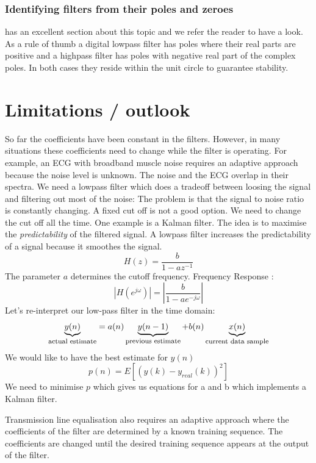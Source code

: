 \documentclass[12pt,a4paper]{article}
\begin{document}
\subsubsection{Identifying filters from their poles and zeroes}
\citet[pp.333]{Proakis1996} has an excellent section about this topic
and we refer the reader to have a look. As a rule of thumb a digital
lowpass filter has poles where their real parts are positive and a
highpass filter has poles with negative real part of the complex
poles. In both cases they reside within the unit circle to guarantee
stability.


\section{Limitations / outlook}
So far the coefficients have been constant in the filters. However,
in many situations these coefficients need to change while the
filter is operating. For example, an ECG with broadband muscle noise
requires an adaptive approach because the noise level is unknown.
The noise and the ECG overlap in their
spectra. We need a lowpass filter which does a tradeoff between loosing
the signal and filtering out most of the noise:
The problem is that the signal to noise ratio is constantly changing.
A fixed cut off is not a good option. We need to change the
cut off all the time. One example is a Kalman filter.
The idea is to maximise the
\textsl{predictability} of the filtered signal.
A lowpass filter increases the predictability of a signal because
it smoothes the signal.
\begin{equation} 
H(z) = \frac{b}{1 - a z^{-1}}
\end{equation}
The parameter $a$ determines the cutoff frequency.
Frequency Response :
\begin{equation} 
|H(e^{j \omega}) | = |\frac{b}{1 - a e^{-j \omega}}| 
\end{equation}
Let's re-interpret our low-pass filter in the time domain:
\begin{equation} 
\underbrace{y(n)}_{\mbox {\footnotesize actual estimate}} = a(n) \underbrace{y(n - 1)}_{\mbox{\footnotesize previous estimate}} + b(n)\underbrace{x(n)}_{\mbox{\footnotesize current data sample}} 
\end{equation}
We would like to have the best estimate for $y(n)$
\begin{equation} 
p(n) = E[ \left( y (k) - y_{real} (k)\right)^{2}] 
\end{equation}
We need to minimise $p$ which gives us equations for a and b which
implements a Kalman filter.

Transmission line equalisation also requires an adaptive approach
where the coefficients of the filter are determined by a known
training sequence. The coefficients are changed until the desired
training sequence appears at the output of the filter.




\end{document}
